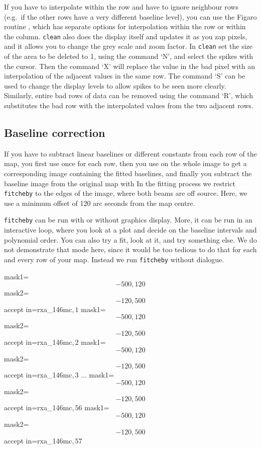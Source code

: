 \documentclass[11pt,noabs]{starlink}
\begin{document}
   If you have to interpolate within the row and have to ignore neighbour
   rows (e.g.\ if the other rows have a very different baseline level),
   you can use the Figaro routine
\texttt{},
   which has separate options for interpolation within the row or within
   the column. \texttt{clean} also does the display itself and updates it
   as you zap pixels, and it allows you to change the grey scale and
   zoom factor. In \texttt{clean} set the size of the area to be deleted to
   1, using the command `N', and select the spikes with the cursor.
   Then the command `X' will replace the value in the bad pixel with an
   interpolation of the adjacent values in the same row. The command `S'
   can be used to change the display levels to allow spikes to be seen
   more clearly. Similarly, entire bad rows of data can be removed using
   the command `R', which substitutes the bad row with the interpolated
   values from the two adjacent rows.


\subsection{\label{base2}Baseline correction}

   If you have to subtract linear baselines or different constants from
   each row of the map, you first use
\texttt{}
   once for each row, then you use
\texttt{}
   on the whole image to get a corresponding image containing the fitted
   baselines, and finally you subtract the baseline image from the
   original map with
\texttt{}
   In the fitting process we restrict \texttt{fitcheby} to the edges of
   the image, where both beams are off source. Here, we use a minimum
   offset of 120 arc seconds from the map centre.

   \texttt{fitcheby} can be run with or without graphics display. More,
   it can be run in an interactive loop, where you look at a plot and
   decide on the baseline intervals and polynomial order. You can also
   try a fit, look at it, and try something else. We do not demonstrate
   that mode here, since it would be too tedious to do that for each and
   every row of your map. Instead we run \texttt{fitcheby} without
   dialogue.

\begin{terminalv}
 mask1=\[-500,120\] mask2=\[-120,500\] accept in=rxa_146mc\(,1\)
 mask1=\[-500,120\] mask2=\[-120,500\] accept in=rxa_146mc\(,2\)
 mask1=\[-500,120\] mask2=\[-120,500\] accept in=rxa_146mc\(,3\)
...
 mask1=\[-500,120\] mask2=\[-120,500\] accept in=rxa_146mc\(,56\)
 mask1=\[-500,120\] mask2=\[-120,500\] accept in=rxa_146mc\(,57\)
\end{terminalv}
\end{document}
